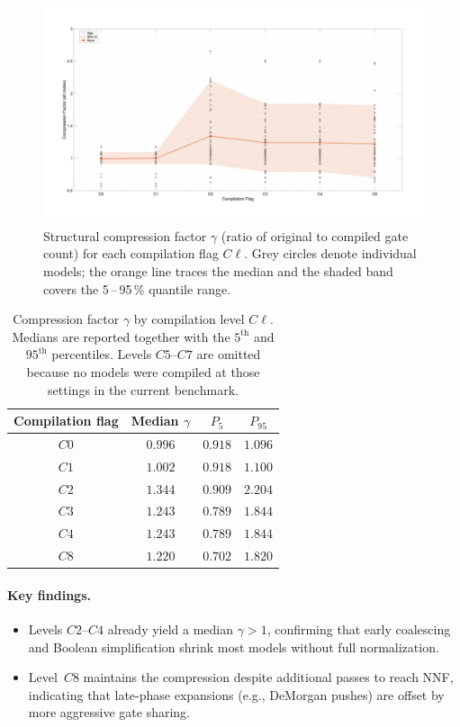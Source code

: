 \begin{figure}[hb]
    \centering
    \includegraphics[width=1\textwidth]{figs/compiler/compiler_compression_vs_flag.png}
    \caption{Structural compression factor $\gamma$ (ratio of original to compiled gate count) for each compilation flag $C\ell$.  Grey circles denote individual models; the orange line traces the median and the shaded band covers the 5\,--\,95\,\% quantile range.}
    \label{fig:compiler_compression_levels}
\end{figure}

\begin{table}[t]
  \centering
  \caption{Compression factor $\gamma$ by compilation level $C\ell$.
           Medians are reported together with the $5^{\mathrm{th}}$
           and $95^{\mathrm{th}}$ percentiles.
           Levels $C5$–$C7$ are omitted because no models were compiled
           at those settings in the current benchmark.}
  \label{tab:micro_compilation_flags}
  \begin{tabular}{cccc}
    \toprule
    Compilation flag & Median $\gamma$ & $P_{5}$ & $P_{95}$ \\
    \midrule
    $C0$ & $0.996$ & $0.918$ & $1.096$ \\
    $C1$ & $1.002$ & $0.918$ & $1.100$ \\
    $C2$ & $1.344$ & $0.909$ & $2.204$ \\
    $C3$ & $1.243$ & $0.789$ & $1.844$ \\
    $C4$ & $1.243$ & $0.789$ & $1.844$ \\
    $C8$ & $1.220$ & $0.702$ & $1.820$ \\
    \bottomrule
  \end{tabular}
\end{table}


\paragraph{Key findings.}
\begin{itemize}
  \item Levels $C2$–$C4$ already yield a median $\gamma>1$, confirming
        that early coalescing and Boolean simplification shrink most
        models without full normalization.
  \item Level~$C8$ maintains the compression despite additional passes
        to reach NNF, indicating that late-phase expansions (e.g.,
        DeMorgan pushes) are offset by more aggressive gate
        sharing.
\end{itemize}

